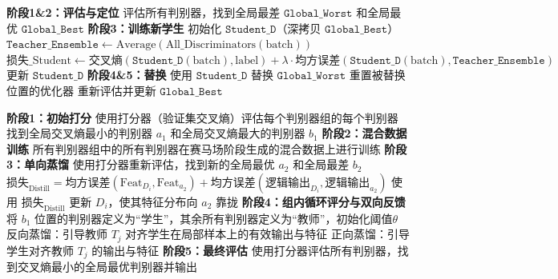 % 
    


\begin{algorithm}[H]
\caption{赛马场竞争机制算法流程}
\label{alg:racetrack}
\begin{algorithmic}[0]
\State \textbf{阶段1\&2：评估与定位}
\State 评估所有判别器，找到全局最差 $\texttt{Global\_Worst}$ 和全局最优 $\texttt{Global\_Best}$
\Statex
\State \textbf{阶段3：训练新学生}
\State 初始化 $\texttt{Student\_D}$（深拷贝 $\texttt{Global\_Best}$）
  \State $\texttt{Teacher\_Ensemble} \gets \text{Average}(\text{All\_Discriminators}(\text{batch}))$
  \State $\text{损失\_Student} \gets \text{交叉熵}(\texttt{Student\_D}(\text{batch}), \text{label}) + \lambda \cdot \text{均方误差}(\texttt{Student\_D}(\text{batch}), \texttt{Teacher\_Ensemble})$
  \State 更新 $\texttt{Student\_D}$
\EndFor
\Statex
\State \textbf{阶段4\&5：替换}
\State 使用 $\texttt{Student\_D}$ 替换 $\texttt{Global\_Worst}$
\State 重置被替换位置的优化器
\State 重新评估并更新 $\texttt{Global\_Best}$
\end{algorithmic}
\end{algorithm}

% 



\begin{algorithm}[H]
\caption{逆向师生蒸馏机制算法流程}
\label{alg:s2t}
\begin{algorithmic}[0]
\State \textbf{阶段1：初始打分}
\State 使用打分器（验证集交叉熵）评估每个判别器组的每个判别器
\State 找到全局交叉熵最小的判别器 $a_1$ 和全局交叉熵最大的判别器 $b_1$
\Statex
\State \textbf{阶段2：混合数据训练}
\State 所有判别器组中的所有判别器在赛马场阶段生成的混合数据上进行训练
\Statex
\State \textbf{阶段3：单向蒸馏}
\State 使用打分器重新评估，找到新的全局最优 $a_2$ 和全局最差 $b_2$
  \State $\text{损失}_{\text{Distill}} = \text{均方误差}(\text{Feat}_{D_i}, \text{Feat}_{a_2}) + \text{均方误差}(\text{逻辑输出}_{D_i}, \text{逻辑输出}_{a_2})$
  \State 使用 $\text{损失}_{\text{Distill}}$ 更新 $D_i$，使其特征分布向 $a_2$ 靠拢
\EndFor
\Statex
\State \textbf{阶段4：组内循环评分与双向反馈}
\State 将 $b_1$ 位置的判别器定义为“学生”，其余所有判别器定义为“教师”，初始化阈值$\theta$
    \State 反向蒸馏：引导教师 $T_j$ 对齐学生在局部样本上的有效输出与特征
    \State 正向蒸馏：引导学生对齐教师 $T_j$ 的输出与特征
  \EndIf
\EndFor
\Statex
\State \textbf{阶段5：最终评估}
\State 使用打分器评估所有判别器，找到交叉熵最小的全局最优判别器并输出
\end{algorithmic}
\end{algorithm}

